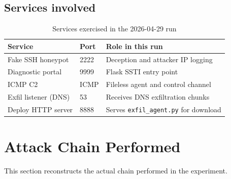 \documentclass[11pt]{article}
\begin{document}
\subsection{Services involved}
\begin{table}[H]
\centering
\begin{tabular}{lll}
\toprule
Service & Port & Role in this run \\
\midrule
Fake SSH honeypot & 2222 & Deception and attacker IP logging \\
Diagnostic portal & 9999 & Flask SSTI entry point \\
ICMP C2 & ICMP & Fileless agent and control channel \\
Exfil listener (DNS) & 53 & Receives DNS exfiltration chunks \\
Deploy HTTP server & 8888 & Serves \texttt{exfil\_agent.py} for download \\
\bottomrule
\end{tabular}
\caption{Services exercised in the 2026-04-29 run}
\end{table}

\section{Attack Chain Performed}

This section reconstructs the actual chain performed in the experiment.
\end{document}
